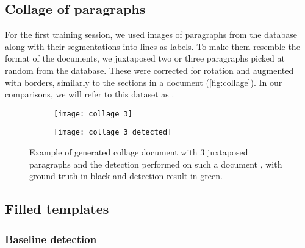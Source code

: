 
	\subsection{Collage of paragraphs}
		For the first training session, we used images of paragraphs from the database along with their segmentations into lines as labels. To make them resemble the format of the documents, we juxtaposed two or three paragraphs picked at random from the database. These were corrected for rotation and augmented with borders, similarly to the sections in a document (\autoref{fig:collage}). In our comparisons, we will refer to this dataset as .


		\begin{figure}
			\centering
			\begin{subfigure}[c]{\textwidth}
				\texttt{[image: collage\_3]}
				\caption{}
				\label{sfig:collage_clean}
			\end{subfigure}

			\begin{subfigure}[c]{\textwidth}
				\texttt{[image: collage\_3\_detected]}
				\caption{}
				\label{sfig:collage_detect}
			\end{subfigure}
			\caption{Example of generated collage document with 3 juxtaposed paragraphs  and the detection performed on such a document , with ground-truth in black and detection result in green.}
			\label{fig:collage}
		\end{figure}


	\subsection{Filled templates}


		\subsubsection{Baseline detection}

